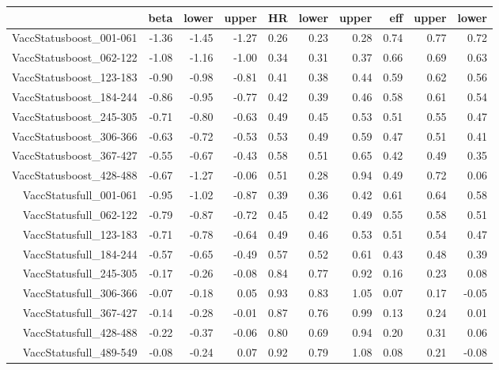 \begin{table}[ht]
\centering
\begin{tabular}{rrrrrrrrrr}
  \hline
 & beta & lower & upper & HR & lower & upper & eff & upper & lower \\ 
  \hline
VaccStatusboost\_001-061 & -1.36 & -1.45 & -1.27 & 0.26 & 0.23 & 0.28 & 0.74 & 0.77 & 0.72 \\ 
  VaccStatusboost\_062-122 & -1.08 & -1.16 & -1.00 & 0.34 & 0.31 & 0.37 & 0.66 & 0.69 & 0.63 \\ 
  VaccStatusboost\_123-183 & -0.90 & -0.98 & -0.81 & 0.41 & 0.38 & 0.44 & 0.59 & 0.62 & 0.56 \\ 
  VaccStatusboost\_184-244 & -0.86 & -0.95 & -0.77 & 0.42 & 0.39 & 0.46 & 0.58 & 0.61 & 0.54 \\ 
  VaccStatusboost\_245-305 & -0.71 & -0.80 & -0.63 & 0.49 & 0.45 & 0.53 & 0.51 & 0.55 & 0.47 \\ 
  VaccStatusboost\_306-366 & -0.63 & -0.72 & -0.53 & 0.53 & 0.49 & 0.59 & 0.47 & 0.51 & 0.41 \\ 
  VaccStatusboost\_367-427 & -0.55 & -0.67 & -0.43 & 0.58 & 0.51 & 0.65 & 0.42 & 0.49 & 0.35 \\ 
  VaccStatusboost\_428-488 & -0.67 & -1.27 & -0.06 & 0.51 & 0.28 & 0.94 & 0.49 & 0.72 & 0.06 \\ 
  VaccStatusfull\_001-061 & -0.95 & -1.02 & -0.87 & 0.39 & 0.36 & 0.42 & 0.61 & 0.64 & 0.58 \\ 
  VaccStatusfull\_062-122 & -0.79 & -0.87 & -0.72 & 0.45 & 0.42 & 0.49 & 0.55 & 0.58 & 0.51 \\ 
  VaccStatusfull\_123-183 & -0.71 & -0.78 & -0.64 & 0.49 & 0.46 & 0.53 & 0.51 & 0.54 & 0.47 \\ 
  VaccStatusfull\_184-244 & -0.57 & -0.65 & -0.49 & 0.57 & 0.52 & 0.61 & 0.43 & 0.48 & 0.39 \\ 
  VaccStatusfull\_245-305 & -0.17 & -0.26 & -0.08 & 0.84 & 0.77 & 0.92 & 0.16 & 0.23 & 0.08 \\ 
  VaccStatusfull\_306-366 & -0.07 & -0.18 & 0.05 & 0.93 & 0.83 & 1.05 & 0.07 & 0.17 & -0.05 \\ 
  VaccStatusfull\_367-427 & -0.14 & -0.28 & -0.01 & 0.87 & 0.76 & 0.99 & 0.13 & 0.24 & 0.01 \\ 
  VaccStatusfull\_428-488 & -0.22 & -0.37 & -0.06 & 0.80 & 0.69 & 0.94 & 0.20 & 0.31 & 0.06 \\ 
  VaccStatusfull\_489-549 & -0.08 & -0.24 & 0.07 & 0.92 & 0.79 & 1.08 & 0.08 & 0.21 & -0.08 \\ 

\end{tabular}
\end{table}
